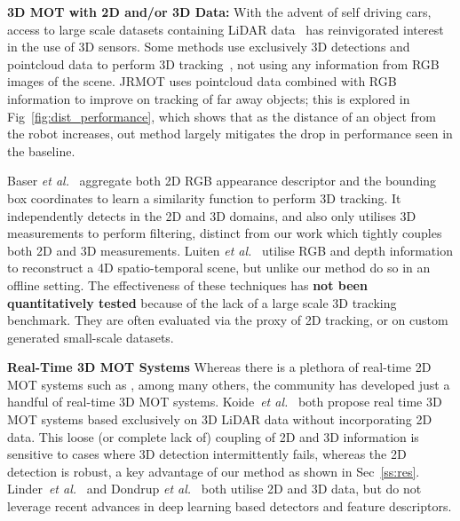 \documentclass[letterpaper, 10 pt, conference]{ieeeconf}
\newcommand{\methodname}{{JRMOT}\xspace}
\newcommand{\etal}{\emph{et al.}\xspace}
\begin{document}
\textbf{3D MOT with 2D and/or 3D Data:}
With the advent of self driving cars, access to large scale datasets containing LiDAR data~\cite{caesar2020nuscenes, Geiger2012CVPR, huang2018apolloscape, yu2018bdd100k} has reinvigorated interest in the use of 3D sensors. Some methods use exclusively 3D detections and pointcloud data to perform 3D tracking~\cite{Luo2018FastAF,Weng2019_3dmot}, not using any information from RGB images of the scene. \methodname uses pointcloud data combined with RGB information to improve on tracking of far away objects; this is explored in Fig~\ref{fig:dist_performance}, which shows that as the distance of an object from the robot increases, out method largely mitigates the drop in performance seen in the baseline.

Baser \etal~\cite{baser2019fantrack} aggregate both 2D RGB appearance descriptor and the bounding box coordinates to learn a similarity function to perform 3D tracking. It independently detects in the 2D and 3D domains, and also only utilises 3D measurements to perform filtering, distinct from our work which tightly couples both 2D and 3D measurements. Luiten \etal~\cite{luiten2020track} utilise RGB and depth information to reconstruct a 4D spatio-temporal scene, but unlike our method do so in an offline setting.
The effectiveness of these techniques has \textbf{not been quantitatively tested} because of the lack of a large scale 3D tracking benchmark. They are often evaluated via the proxy of 2D tracking, or on custom generated small-scale datasets.














\textbf{Real-Time 3D MOT Systems}
Whereas there is a plethora of real-time 2D MOT systems such as \cite{wojke2017simple, wang2019towards, sun2019deep} , among many others, the community has developed just a handful of real-time 3D MOT systems. Koide~\etal~\cite{koide2019portable, spinello2011tracking} both propose real time 3D MOT systems based exclusively on 3D LiDAR data without incorporating 2D data. This loose (or complete lack of) coupling of 2D and 3D information is sensitive to cases where 3D detection intermittently fails, whereas the 2D detection is robust, a key advantage of our method as shown in Sec~\ref{ss:res}. Linder~\etal~\cite{linder2016people} and Dondrup \etal~\cite{dondrup2015real} both utilise 2D and 3D data, but do not leverage recent advances in deep learning based detectors and feature descriptors.
\end{document}
